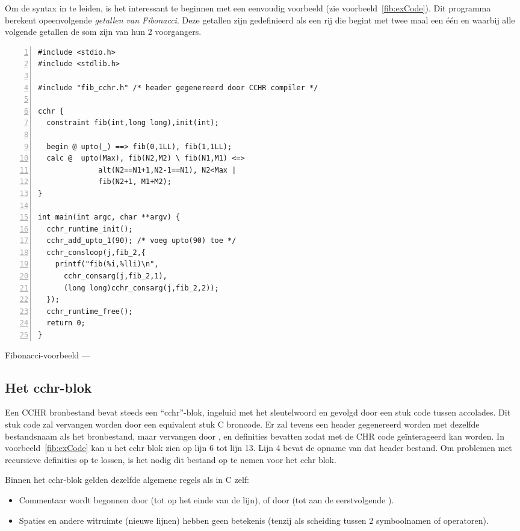 Om de syntax in te leiden, is het interessant te beginnen met een eenvoudig voorbeeld (zie voorbeeld~\ref{fib:exCode}). Dit programma berekent opeenvolgende {\em getallen van Fibonacci}. Deze getallen zijn gedefinieerd als een rij die begint met twee maal een \'e\'en en waarbij alle volgende getallen de som zijn van hun 2 voorgangers.

\begin{exCode}
\begin{Verbatim}[frame=single,numbers=left]
#include <stdio.h>
#include <stdlib.h>

#include "fib_cchr.h" /* header gegenereerd door CCHR compiler */

cchr {
  constraint fib(int,long long),init(int);

  begin @ upto(_) ==> fib(0,1LL), fib(1,1LL);
  calc @  upto(Max), fib(N2,M2) \ fib(N1,M1) <=>
              alt(N2==N1+1,N2-1==N1), N2<Max |
              fib(N2+1, M1+M2);
}

int main(int argc, char **argv) {
  cchr_runtime_init();
  cchr_add_upto_1(90); /* voeg upto(90) toe */
  cchr_consloop(j,fib_2,{
    printf("fib(%i,%lli)\n", 
      cchr_consarg(j,fib_2,1),
      (long long)cchr_consarg(j,fib_2,2));
  });
  cchr_runtime_free();
  return 0;
}
\end{Verbatim}
\caption{\label{fib:exCode} Fibonacci-voorbeeld --- }
\end{exCode}

\subsection{Het cchr-blok}

Een CCHR bronbestand bevat steeds een ``cchr''-blok, ingeluid met het sleutelwoord  en gevolgd door een stuk code tussen accolades. Dit stuk code zal vervangen worden door een equivalent stuk C broncode. Er zal tevens een header gegenereerd worden met dezelfde bestandsnaam als het bronbestand, maar  vervangen door , en definities bevatten zodat met de CHR code ge\"interageerd kan worden. In voorbeeld~\ref{fib:exCode} kan u het cchr blok zien op lijn 6 tot lijn 13. Lijn 4 bevat de opname van dat header bestand. Om problemen met recursieve definities op te lossen, is het nodig dit bestand op te nemen voor het cchr blok.

Binnen het cchr-blok gelden dezelfde algemene regels als in C zelf: \begin{itemize}
  \item Commentaar wordt begonnen door \code{//} (tot op het einde van de lijn), of door \code{/*} (tot aan de eerstvolgende \code{*/}).
  \item Spaties en andere witruimte (nieuwe lijnen) hebben geen betekenis (tenzij als scheiding tussen 2 symboolnamen of operatoren).
\end{itemize}

